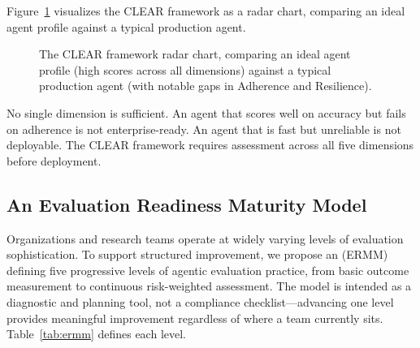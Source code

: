 Figure~\ref{fig:clear_radar} visualizes the CLEAR framework as a radar chart, comparing an ideal agent profile against a typical production agent.

\begin{figure}[htbp]
\centering
\resizebox{0.84\columnwidth}{!}{}
\caption{The CLEAR framework radar chart, comparing an ideal agent profile (high scores across all dimensions) against a typical production agent (with notable gaps in Adherence and Resilience).}
\label{fig:clear_radar}
\end{figure}

No single dimension is sufficient. An agent that scores well on accuracy but fails on adherence is not enterprise-ready. An agent that is fast but unreliable is not deployable. The CLEAR framework requires assessment across all five dimensions before deployment.

\subsection{An Evaluation Readiness Maturity Model}

Organizations and research teams operate at widely varying levels of evaluation sophistication. To support structured improvement, we propose an  (ERMM) defining five progressive levels of agentic evaluation practice, from basic outcome measurement to continuous risk-weighted assessment. The model is intended as a diagnostic and planning tool, not a compliance checklist---advancing one level provides meaningful improvement regardless of where a team currently sits. Table~\ref{tab:ermm} defines each level.

